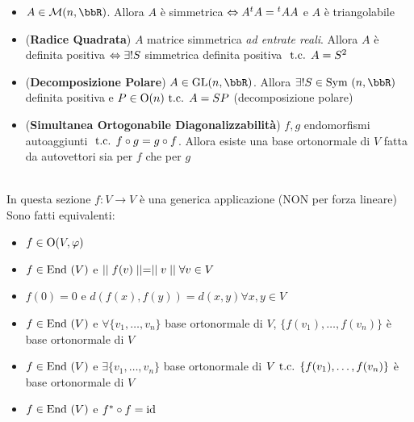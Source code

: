\documentclass[a4paper,NoNotes,GeneralMath]{stdmdoc}
\begin{document}
\begin{itemize}
		\item $A \in \mathcal{M}(n, \bbR)$. Allora $A$ è simmetrica $\Leftrightarrow A {}^tA = {}^tAA$ e $A$ è triangolabile
		\item ({\bf Radice Quadrata}) $A$ matrice simmetrica {\it ad entrate reali}. Allora $A$ è definita positiva $\Leftrightarrow \exists ! S$ simmetrica definita positiva $\mbox{ t.c. } A = S^2$
		\item ({\bf Decomposizione Polare}) $A \in \GL(n, \bbR)$. Allora $\exists ! S \in \Symm(n, \bbR)$ definita positiva e $P \in \mbox{O}(n) \mbox{ t.c. } A = SP$ (decomposizione polare)
		\item ({\bf Simultanea Ortogonabile Diagonalizzabilità}) $f, g$ endomorfismi autoaggiunti $\mbox{ t.c. } f \circ g = g \circ f$. Allora esiste una base ortonormale di $V$ fatta da autovettori sia per $f$ che per $g$
	\end{itemize}

	 \\
	In questa sezione $f: V \rightarrow V$ è una generica applicazione (NON per forza lineare) \\
	Sono fatti equivalenti:
	\begin{itemize}
		\item $f \in \mbox{O}(V, \varphi)$
		\item $f \in \mbox{End }(V)$ e $\mid\mid f(v) \mid\mid = \mid\mid v \mid\mid \forall v \in V$
		\item $f(0)=0$ e $d(f(x), f(y)) = d(x, y) \forall x, y \in V$
		\item $f \in \mbox{End }(V)$ e $\forall \{v_1, \ldots, v_n\}$ base ortonormale di $V$, $\{f(v_1), \ldots, f(v_n)\}$ è base ortonormale di $V$
		\item $f \in \mbox{End }(V)$ e $\exists \{v_1, \ldots, v_n\}$ base ortonormale di $V \mbox{ t.c. } \{f(v_1), \ldots, f(v_n)\}$ è base ortonormale di $V$
		\item $f \in \mbox{End }(V)$ e $f^{*} \circ f = \mbox{id}$
	\end{itemize}
\end{document}
